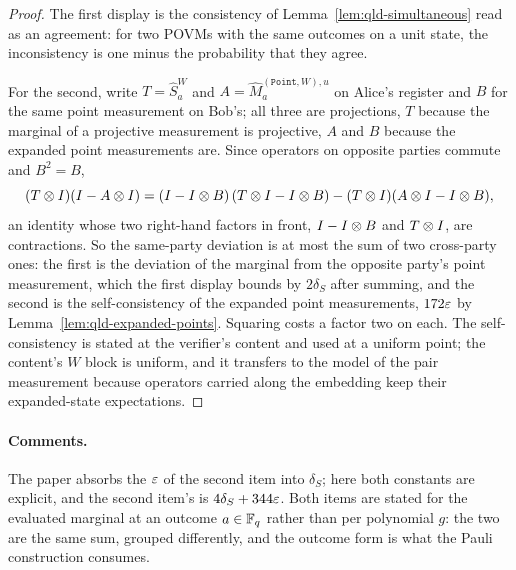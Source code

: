 \begin{proof}
\leanok
The first display is the consistency of Lemma~\ref{lem:qld-simultaneous} read as an agreement:
for two POVMs with the same outcomes on a unit state, the inconsistency is one minus the
probability that they agree.

For the second, write $T = \widehat S^W_a$ and $A = \widehat M^{(\mathtt{Point}, W), u}_a$ on
Alice's register and $B$ for the same point measurement on Bob's; all three are projections, $T$
because the marginal of a projective measurement is projective, $A$ and $B$ because the expanded
point measurements are. Since operators on opposite parties commute and $B^2 = B$,
\[
  (T \otimes I)(I - A \otimes I)
    = (I - I \otimes B)\,(T \otimes I - I \otimes B) - (T \otimes I)(A \otimes I - I \otimes B) ,
\]
an identity whose two right-hand factors in front, $I - I \otimes B$ and $T \otimes I$, are
contractions. So the same-party deviation is at most the sum of two cross-party ones: the first
is the deviation of the marginal from the opposite party's point measurement, which the first
display bounds by $2\delta_S$ after summing, and the second is the self-consistency of the
expanded point measurements, $172\varepsilon$ by Lemma~\ref{lem:qld-expanded-points}. Squaring costs a
factor two on each. The self-consistency is stated at the verifier's content and used at a
uniform point; the content's $W$ block is uniform, and it transfers to the model of the pair
measurement because operators carried along the embedding keep their expanded-state
expectations.
\end{proof}

\paragraph{Comments.} The paper absorbs the $\varepsilon$ of the second item into $\delta_S$; here both
constants are explicit, and the second item's is $4\delta_S + 344\varepsilon$. Both items are stated for
the evaluated marginal at an outcome $a \in \mathbb{F}_q$ rather than per polynomial $g$: the two are the
same sum, grouped differently, and the outcome form is what the Pauli construction consumes.

\effortHard

